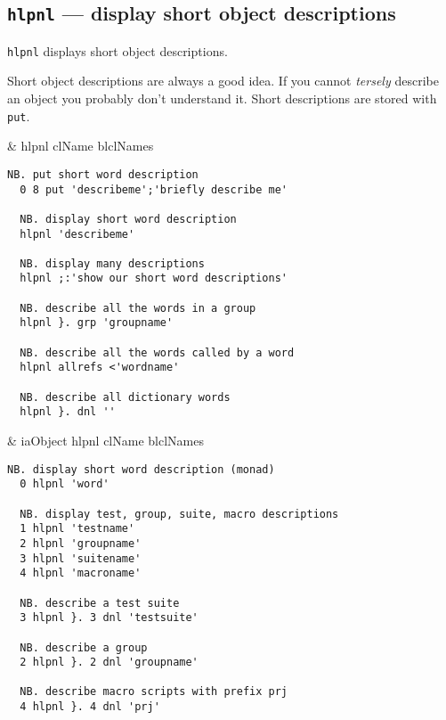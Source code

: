 \subsection{\texttt{hlpnl} --- display short object descriptions}

\texttt{hlpnl} displays short object descriptions.  

Short object descriptions are always a good idea.  
If you cannot \emph{tersely} describe an object you probably don't 
understand it.  Short descriptions 
are stored with \hypertarget{il:put}{\texttt{put}}.

\begin{wordhead}
\monad & hlpnl clName \argsep blclNames \\
\end{wordhead}
\begin{lstlisting}[frame=single,framerule=0pt] 
  NB. put short word description 
  0 8 put 'describeme';'briefly describe me' 

  NB. display short word description
  hlpnl 'describeme' 

  NB. display many descriptions
  hlpnl ;:'show our short word descriptions'

  NB. describe all the words in a group
  hlpnl }. grp 'groupname'

  NB. describe all the words called by a word
  hlpnl allrefs <'wordname'

  NB. describe all dictionary words
  hlpnl }. dnl ''
\end{lstlisting}

\begin{wordhead}
\dyad & iaObject hlpnl clName \argsep blclNames \\
\end{wordhead}
\begin{lstlisting}[frame=single,framerule=0pt] 
  NB. display short word description (monad)
  0 hlpnl 'word' 

  NB. display test, group, suite, macro descriptions
  1 hlpnl 'testname'
  2 hlpnl 'groupname'
  3 hlpnl 'suitename'
  4 hlpnl 'macroname'

  NB. describe a test suite
  3 hlpnl }. 3 dnl 'testsuite'

  NB. describe a group
  2 hlpnl }. 2 dnl 'groupname'

  NB. describe macro scripts with prefix prj
  4 hlpnl }. 4 dnl 'prj'
\end{lstlisting}


